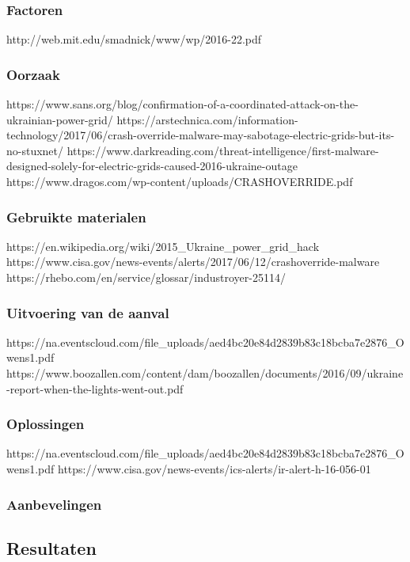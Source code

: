 \subsubsection{Factoren}
http://web.mit.edu/smadnick/www/wp/2016-22.pdf
\cite{shehod2016gridadvantageus}
\subsubsection{Oorzaak}
https://www.sans.org/blog/confirmation-of-a-coordinated-attack-on-the-ukrainian-power-grid/
\cite{rocha2017cybersecyrityanalysisScada}
https://arstechnica.com/information-technology/2017/06/crash-override-malware-may-sabotage-electric-grids-but-its-no-stuxnet/
\cite{2017crashoverridenostuxnet}
https://www.darkreading.com/threat-intelligence/first-malware-designed-solely-for-electric-grids-caused-2016-ukraine-outage
\cite{vijayan2017firstmalwareCausedOutage}
https://www.dragos.com/wp-content/uploads/CRASHOVERRIDE.pdf
\cite{slowik2019ReassasUkraine2016Attack}
\subsubsection{Gebruikte materialen}
https://en.wikipedia.org/wiki/2015_Ukraine_power_grid_hack
\cite{2015ukrainegridattack}
https://www.cisa.gov/news-events/alerts/2017/06/12/crashoverride-malware
\cite{}
https://rhebo.com/en/service/glossar/industroyer-25114/
\cite{industroyershortfact}

\subsubsection{Uitvoering van de aanval}
https://na.eventscloud.com/file_uploads/aed4bc20e84d2839b83c18bcba7e2876_Owens1.pdf
\cite{Whitehead2017ukrainepoweroutage}
https://www.boozallen.com/content/dam/boozallen/documents/2016/09/ukraine-report-when-the-lights-went-out.pdf
\cite{boozallen2016lightwentout}
\subsubsection{Oplossingen}
https://na.eventscloud.com/file_uploads/aed4bc20e84d2839b83c18bcba7e2876_Owens1.pdf
\cite{Whitehead2017ukrainepoweroutage}
https://www.cisa.gov/news-events/ics-alerts/ir-alert-h-16-056-01
\cite{}
\subsubsection{Aanbevelingen}

\subsection{Resultaten}
